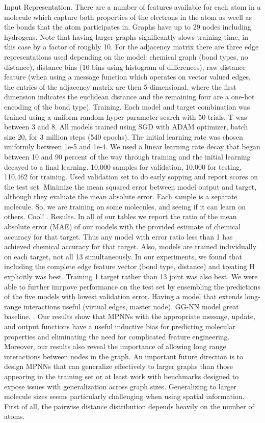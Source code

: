 \documentclass[12pt,reqno]{amsart}
\numberwithin{equation}{section}
\begin{document}
\begin{enumerate}
\subitem Input Representation.  There are a number of features available for each atom in a molecule which capture both properties of the electrons in the atom as weell as the bonds that the atom participates in.  Graphs have up to 29 nodes including hydrogens.  Note that having larger graphs significantly slows training time, in this case by a factor of roughly 10.  For the adjacency matrix there are three edge representations used depending on the model: chemical graph (bond types, no distance), distance bins (10 bins using histogram of differences), raw distance feature (when using a message function which operates on vector valued edges, the entries of the adjacency matrix are then 5-dimensional, where the first dimension indicates the euclidean distance and the remaining four are a one-hot encoding of the bond type).  
\subitem Training.  Each model and target combination was trained using a uniform random hyper parameter search with 50 trials.  T was between 3 and 8.  All models trained using SGD with ADAM optimizer, batch size 20, for 3 million steps (540 epochs).  The initial learning rate was chosen uniformly between 1e-5 and 1e-4.  We used a linear learning rate decay that began between 10 and 90 percent of the way through training and the initial learning decayed to a final learning.  10,000 samples for validation, 10,000 for testing, 110,462 for training.  Used validation set to do early sopping and report scores on the test set.  Minimize the mean squared error between model output and target, although they evaluate the mean absolute error.  Each sample is a separate molecule.  So, we are training on some molecules, and seeing if it can learn on others.  Cool!  
.  Results.  In all of our tables we report the ratio of the mean absolute error (MAE) of our models with the provided estimate of chemical accuracy for that target.  Thus any model with error ratio less than 1 has achieved chemical accuracy for that target.  Also, models are trained individually on each target, not all 13 simultaneously.  In our experiments, we found that including the complete edge feature vector (bond type, distance) and treating H explicitly was best.  Training 1 target rather than 13 joint was also best.  We were able to further imrpove performance on the test set by ensembling the predictions of the five models with lowest validation error.  Having a model that extends long-range interactions useful (virtual edges, master node).  GG-NN model great baseline.  
.  Our results show that MPNNs with the appropriate message, update, and output functions have a useful inductive bias for predicting molecular properties and eliminating the need for complicated feature engineering.  Moreover, our results also reveal the importance of allowing long range interactions between nodes in the graph.  An important future direction is to design MPNNs that can generalize effectively to larger graphs than those appearing in the training set or at least work with benchmarks designed to expose issues with generalization across graph sizes.  Generalizing to larger molecule sizes seems particularly challenging when using spatial information.  First of all, the pairwise distance distribution depends heavily on the number of atoms.  


\end{enumerate}
\end{document}
